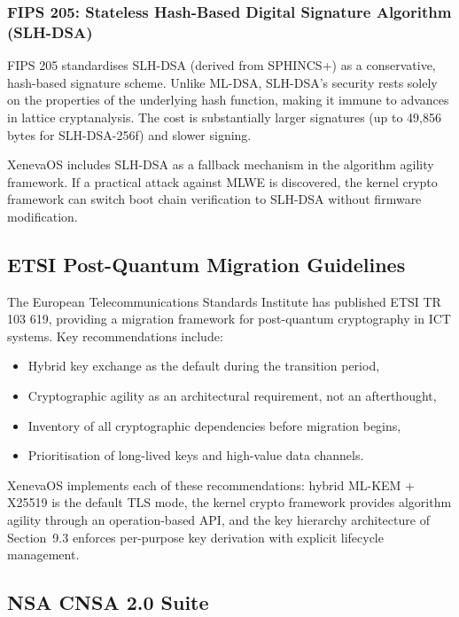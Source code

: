 \documentclass[11pt, a4paper]{article}
\begin{document}
\subsubsection{FIPS 205: Stateless Hash-Based Digital Signature Algorithm (SLH-DSA)}

FIPS 205 standardises SLH-DSA (derived from SPHINCS+) as a conservative, hash-based signature scheme. Unlike ML-DSA, SLH-DSA's security rests solely on the properties of the underlying hash function, making it immune to advances in lattice cryptanalysis. The cost is substantially larger signatures (up to 49,856 bytes for SLH-DSA-256f) and slower signing.

XenevaOS includes SLH-DSA as a fallback mechanism in the algorithm agility framework. If a practical attack against MLWE is discovered, the kernel crypto framework can switch boot chain verification to SLH-DSA without firmware modification.

\subsection{ETSI Post-Quantum Migration Guidelines}\label{sec:etsi}

The European Telecommunications Standards Institute has published ETSI TR 103 619, providing a migration framework for post-quantum cryptography in ICT systems. Key recommendations include:

\begin{itemize}
    \item Hybrid key exchange as the default during the transition period,
    \item Cryptographic agility as an architectural requirement, not an afterthought,
    \item Inventory of all cryptographic dependencies before migration begins,
    \item Prioritisation of long-lived keys and high-value data channels.
\end{itemize}

XenevaOS implements each of these recommendations: hybrid ML-KEM + X25519 is the default TLS mode, the kernel crypto framework provides algorithm agility through an operation-based API, and the key hierarchy architecture of Section~9.3 enforces per-purpose key derivation with explicit lifecycle management.

\subsection{NSA CNSA 2.0 Suite}\label{sec:cnsa2}
\end{document}
